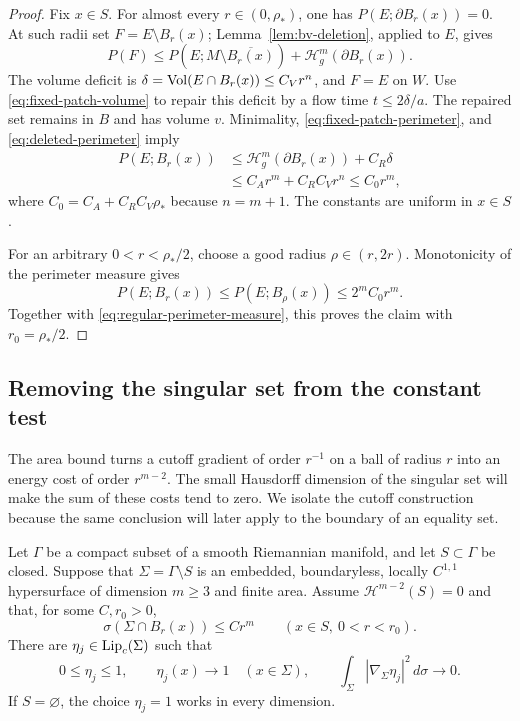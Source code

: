 \begin{proof}
Fix $x\in S$.  For almost every $r\in(0,\rho_*)$, one has
$P(E;\partial B_r(x))=0$. At such radii set $F=E\setminus B_r(x)$;
Lemma~\ref{lem:bv-deletion}, applied to $E$, gives
\begin{equation}
\label{eq:deleted-perimeter}
 P(F)\le P(E;M\setminus\overline{B_r(x)})
       +\mathcal H_g^m(\partial B_r(x)).
\end{equation}
The volume deficit is
$\delta=\operatorname{Vol}(E\cap B_r(x))\le C_Vr^n$, and $F=E$ on $W$.
Use \eqref{eq:fixed-patch-volume} to repair this deficit by a flow
time $t\le2\delta/a$.  The repaired set remains in $B$ and has
volume $v$.  Minimality, \eqref{eq:fixed-patch-perimeter}, and
\eqref{eq:deleted-perimeter} imply
\[
 \begin{split}
 P(E;B_r(x))
 &\le\mathcal H_g^m(\partial B_r(x))+C_R\delta\\
 &\le C_Ar^m+C_RC_Vr^n\le C_0r^m,
 \end{split}
\]
where $C_0=C_A+C_RC_V\rho_*$ because $n=m+1$.
The constants are uniform in $x\in S$.

For an arbitrary $0<r<\rho_*/2$, choose a good radius
$\rho\in(r,2r)$.  Monotonicity of the perimeter measure gives
\[
 P(E;B_r(x))\le P(E;B_\rho(x))\le2^m C_0r^m.
\]
Together with \eqref{eq:regular-perimeter-measure}, this proves the
claim with $r_0=\rho_*/2$.
\end{proof}

\subsection{Removing the singular set from the constant test}

The area bound turns a cutoff gradient of order $r^{-1}$ on a ball of
radius $r$ into an energy cost of order $r^{m-2}$. The small Hausdorff
dimension of the singular set will make the sum of these costs tend to
zero. We isolate the cutoff construction because the same conclusion
will later apply to the boundary of an equality set.

\begin{lemma}\label{lem:capacity-cutoffs}
Let $\Gamma$ be a compact subset of a smooth Riemannian manifold, and
let $S\subset\Gamma$ be closed. Suppose that
$\Sigma=\Gamma\setminus S$ is an embedded, boundaryless, locally
$C^{1,1}$ hypersurface of dimension $m\ge3$ and finite area.
Assume $\mathcal H^{m-2}(S)=0$ and that, for some $C,r_0>0$,
\[
 \sigma(\Sigma\cap B_r(x))\le Cr^m
 \qquad(x\in S,\ 0<r<r_0).
\]
There are $\eta_j\in\operatorname{Lip}_c(\Sigma)$ such that
\begin{equation}\label{eq:singular-cutoff-properties}
 0\le\eta_j\le1,\qquad \eta_j(x)\longrightarrow1\quad(x\in\Sigma),
 \qquad \int_\Sigma|\nabla_\Sigma\eta_j|^2\,d\sigma\longrightarrow0.
\end{equation}
If $S=\varnothing$, the choice $\eta_j=1$ works in every dimension.
\end{lemma}

